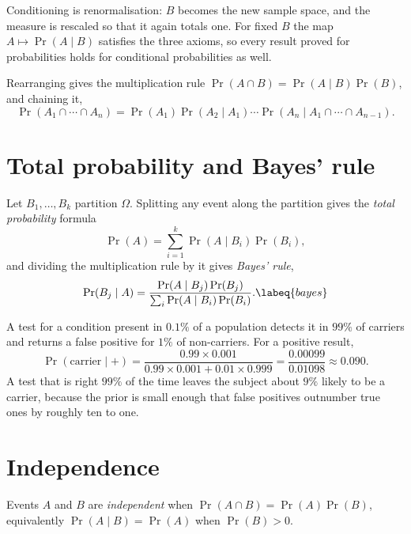Conditioning is renormalisation: \(B\) becomes the new sample space, and the
measure is rescaled so that it again totals one. For fixed \(B\) the map
\(A\mapsto\Pr(A\mid B)\) satisfies the three axioms, so every result proved for
probabilities holds for conditional probabilities as well.

Rearranging gives the multiplication rule
\(\Pr(A\cap B)=\Pr(A\mid B)\Pr(B)\), and chaining it,
\[
	\Pr(A_1\cap\cdots\cap A_n)
	=\Pr(A_1)\Pr(A_2\mid A_1)\cdots\Pr(A_n\mid A_1\cap\cdots\cap A_{n-1}).
\]

\section{Total probability and Bayes' rule}

Let \(B_1,\ldots,B_k\) partition \(\Omega\). Splitting any event along the
partition gives the \emph{total probability} formula
\[
	\Pr(A)=\sum_{i=1}^{k}\Pr(A\mid B_i)\Pr(B_i),
\]
and dividing the multiplication rule by it gives \emph{Bayes' rule},
\begin{equation}
	\Pr(B_j\mid A)=\frac{\Pr(A\mid B_j)\Pr(B_j)}{\sum_{i}\Pr(A\mid B_i)\Pr(B_i)} .
	\labeq{bayes}
\end{equation}

\begin{example}
A test for a condition present in \(0.1\%\) of a population detects it in
\(99\%\) of carriers and returns a false positive for \(1\%\) of non-carriers.
For a positive result,
\[
	\Pr(\text{carrier}\mid+)
	=\frac{0.99\times0.001}{0.99\times0.001+0.01\times0.999}
	=\frac{0.00099}{0.01098}\approx0.090 .
\]
A test that is right \(99\%\) of the time leaves the subject about \(9\%\) likely
to be a carrier, because the prior is small enough that false positives
outnumber true ones by roughly ten to one.
\end{example}


\section{Independence}

\begin{definition}
Events \(A\) and \(B\) are \emph{independent} when
\(\Pr(A\cap B)=\Pr(A)\Pr(B)\), equivalently \(\Pr(A\mid B)=\Pr(A)\) when
\(\Pr(B)>0\).
\end{definition}

